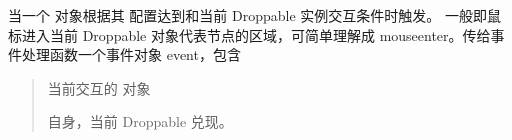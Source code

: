 \documentclass[letterpaper,10pt,english]{sphinxmanual}
\begin{document}
\begin{fulllineitems}
\label{api/component/dd/droppable:DD.Droppable.dropenter}
当一个 {\hyperref[api/component/dd/draggable:DD.Draggable]{}} 对象根据其 {\hyperref[api/component/dd/draggable:DD.Draggable.config.mode]{}} 配置达到和当前 Droppable 实例交互条件时触发。
一般即鼠标进入当前 Droppable 对象代表节点的区域，可简单理解成 mouseenter。传给事件处理函数一个事件对象 event，包含
\begin{quote}


\begin{fulllineitems}
\label{api/component/dd/droppable:DD.Droppable.dropenter.event.drag}
当前交互的  对象

\end{fulllineitems}



\begin{fulllineitems}
\label{api/component/dd/droppable:DD.Droppable.dropenter.event.drop}
自身，当前 Droppable 兑现。

\end{fulllineitems}

\end{quote}

\end{fulllineitems}


\end{document}

